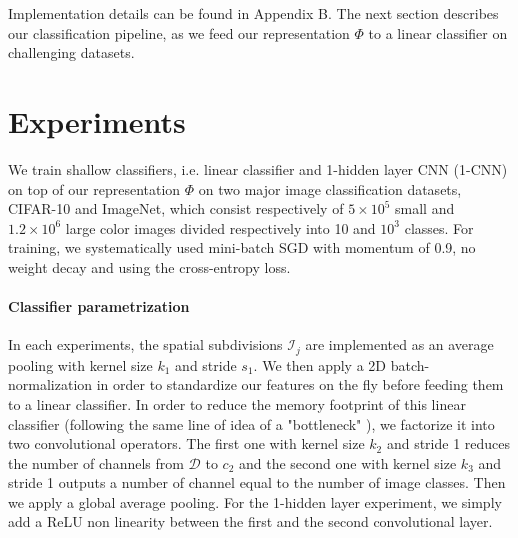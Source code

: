 \documentclass{article}
\begin{document}
Implementation details can be found in Appendix B. The next section describes our classification pipeline, as we feed our representation $\Phi$ to a linear classifier on challenging datasets.




\section{Experiments}
\label{experiments}
We train  shallow classifiers, i.e. linear classifier and 1-hidden layer CNN (1-CNN) on top of our representation $\Phi$ on two major  image classification datasets,  CIFAR-10 and ImageNet, which consist respectively of $5\times10^5$ small and $1.2\times10^6$ large color images  divided respectively into 10 and $10^3$ classes.
For training, we systematically used mini-batch SGD with momentum of 0.9, no weight decay and using the cross-entropy loss.

\vspace{-0.3cm}
\paragraph{Classifier parametrization} In each experiments, the spatial subdivisions $\mathcal{I}_j$ are implemented as an average pooling with kernel size $k_1$ and stride $s_1$.
We then apply a 2D batch-normalization \citep{ioffe2015batch} in order to standardize our features on the fly before feeding them to a linear classifier.
In order to reduce the memory footprint of this linear classifier (following the same line of idea of a "bottleneck" \citep{he2016deep}), we factorize it into two convolutional operators.
The first one with kernel size $k_2$ and stride 1 reduces the number of channels from $\mathcal{D}$ to $c_2$ and the second one with kernel size $k_3$ and stride 1 outputs a number of channel equal to the number of image classes.
Then we apply a global average pooling.
For the 1-hidden layer experiment, we simply add a ReLU non linearity between the first and the second convolutional layer.




\vspace{-0.1cm}
\end{document}
